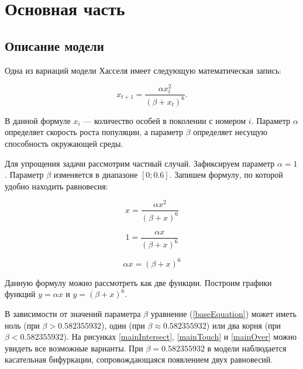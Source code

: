 \section{Основная часть}

    \subsection{Описание модели}

        Одна из вариаций модели Хасселя имеет следующую математическая запись:

        \begin{equation}
            x_{t+1} = \frac{\alpha x_t^2}{(\beta + x_t)^6}.
        \end{equation}

        В данной формуле \(x_i\) --- количество особей в поколении с номером \(i\). Параметр \(\alpha\) определяет скорость роста популяции, а параметр \(\beta\) определяет несущую способность окружающей среды.
    
        Для упрощения задачи рассмотрим частный случай. Зафиксируем параметр \(\alpha = 1\). Параметр \(\beta\) изменяется в диапазоне \([0; 0.6]\). Запишем формулу, по которой удобно находить равновесия:

        \[x = \frac{\alpha x^2}{(\beta + x)^6}\]
    
        \[1 = \frac{\alpha x}{(\beta + x)^6}\]

        \begin{equation}
            \label{baseEquation}
            \alpha x = (\beta + x)^6
        \end{equation}

        Данную формулу можно рассмотреть как две функции. Построим графики функций \(y = \alpha x\) и \(y = (\beta + x)^6\). 
        
        В зависимости от значений параметра \(\beta\) уравнение (\ref{baseEquation}) может иметь ноль (при \(\beta > 0.582355932\)), один (при \(\beta \approx 0.582355932\)) или два корня (при \(\beta < 0.582355932\)). На рисунках \ref{mainIntersect}, \ref{mainTouch} и \ref{mainOver} можно увидеть все возможные варианты. При \(\beta=0.582355932\) в модели наблюдается касательная бифуркации, сопровождающаяся появлением двух равновесий.

